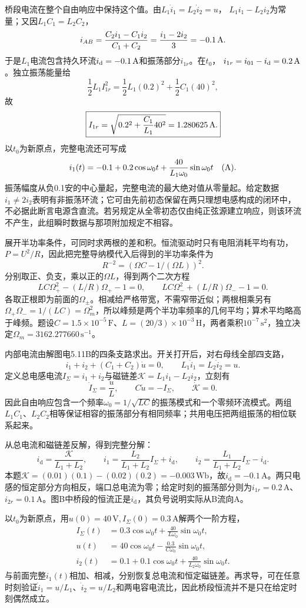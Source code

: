 \documentclass[UTF8,fontset=fandol,a4paper,11pt]{ctexart}
\begin{document}
桥段电流在整个自由响应中保持这个值。由$L_1\dot i_1=L_2\dot i_2=u$，
$L_1i_1-L_2i_2$为常量；又因$L_1C_1=L_2C_2$，
\[
 i_{AB}=\frac{C_2i_1-C_1i_2}{C_1+C_2}
 =\frac{i_1-2i_2}{3}=-0.1\,{\rm A}.
\]
于是$L_1$电流包含持久环流$i_{\rm d}=-0.1\,{\rm A}$和振荡部分$i_{1r}$。在$t_0$，
$i_{1r}=i_{01}-i_{\rm d}=0.2\,{\rm A}$。独立振荡能量给
\[
 \frac12L_1 I_{1r}^2
 =\frac12L_1(0.2)^2+\frac12C_1(40)^2,
\]
故
\[
 \boxed{I_{1r}=\sqrt{0.2^2+\frac{C_1}{L_1}40^2}
 =1.280625\,{\rm A}.}
\]
以$t_0$为新原点，完整电流还可写成
\[
 i_1(t)=-0.1+0.2\cos\omega_0t+
 \frac{40}{L_1\omega_0}\sin\omega_0t\quad({\rm A}).
\]
振荡幅度从负0.1安的中心量起，完整电流的最大绝对值从零量起。给定数据$i_1\ne2i_2$表明有非振荡环流；它可由先前初态保留在两只理想电感构成的闭环中，不必据此断言电源含直流。若另规定从全零初态仅由纯正弦源建立响应，则该环流不产生，此组瞬时数据与那项附加规定不相容。


展开半功率条件，可同时求两根的差和积。恒流驱动时只有电阻消耗平均有功，$P=U^2/R$，因此把完整导纳模代入后得到的半功率条件为
\[
R^{-2}=(\Omega C-1/(\Omega L))^2.
\]
分别取正、负支，乘以正的$\Omega L$，得到两个二次方程
\[
LC\Omega_+^2-(L/R)\Omega_+-1=0,\qquad
LC\Omega_-^2+(L/R)\Omega_--1=0.
\]
各取正根即为前面的$\Omega_\pm$。相减给严格带宽，不需窄带近似；两根相乘另有$\Omega_+\Omega_-=1/(LC)=\Omega_m^2$，所以峰频是两个半功率频率的几何平均；算术平均略高于峰频。题设$C=1.5\times10^{-5}\,\mathrm F$、$L=(20/3)\times10^{-3}\,\mathrm H$，两者乘积$10^{-7}\,\mathrm{s^2}$，独立决定$\Omega_m=3162.277660\,\mathrm{s^{-1}}$。

内部电流由解图电5.11B的四条支路求出。开关打开后，对右母线全部四支路，
\[
i_1+i_2+(C_1+C_2)\dot u=0,\qquad
L_1\dot i_1=L_2\dot i_2=u.
\]
定义总电感电流$I_\Sigma=i_1+i_2$与磁链差$\mathcal K=L_1i_1-L_2i_2$，立刻有
\[
\dot I_\Sigma=\frac uL,\qquad C\dot u=-I_\Sigma,\qquad
\dot{\mathcal K}=0.
\]
因此自由响应包含一个频率$\omega_0=1/\sqrt{LC}$的振荡模式和一个零频环流模式。两组$L_1C_1$、$L_2C_2$相等保证相容的振荡部分有相同频率；共用电压把两组振荡的相位联系起来。

从总电流和磁链差反解，得到完整分解：
\[
i_{\mathrm d}=\frac{\mathcal K}{L_1+L_2},\qquad
i_1=\frac{L_2}{L_1+L_2}I_\Sigma+i_{\mathrm d},\qquad
i_2=\frac{L_1}{L_1+L_2}I_\Sigma-i_{\mathrm d}.
\]
本题$\mathcal K=(0.01)(0.1)-(0.02)(0.2)=-0.003\,\mathrm{Wb}$，故$i_{\mathrm d}=-0.1\,\mathrm A$。两只电感的恒定部分方向相反，端口总电流为零；给定时刻的振荡部分则为$i_{1r}=0.2\,\mathrm A$、$i_{2r}=0.1\,\mathrm A$。图B中桥段的恒流正是$i_{\mathrm d}$，其负号说明实际从B流向A。

以$t_0$为新原点，用$u(0)=40\,\mathrm V,I_\Sigma(0)=0.3\,\mathrm A$解两个一阶方程，
\[
\begin{aligned}
I_\Sigma(t)&=0.3\cos\omega_0t+\frac{40}{L\omega_0}\sin\omega_0t,\\
u(t)&=40\cos\omega_0t-\frac{0.3}{C\omega_0}\sin\omega_0t,\\
i_2(t)&=0.1+0.1\cos\omega_0t+\frac{40}{L_2\omega_0}\sin\omega_0t.
\end{aligned}
\]
与前面完整$i_1(t)$相加、相减，分别恢复总电流和恒定磁链差。再求导，可在任意时刻验证$\dot i_1=u/L_1$、$\dot i_2=u/L_2$和两电容电流比，因此桥段恒流并不是只在给定时刻偶然成立。
\end{document}
